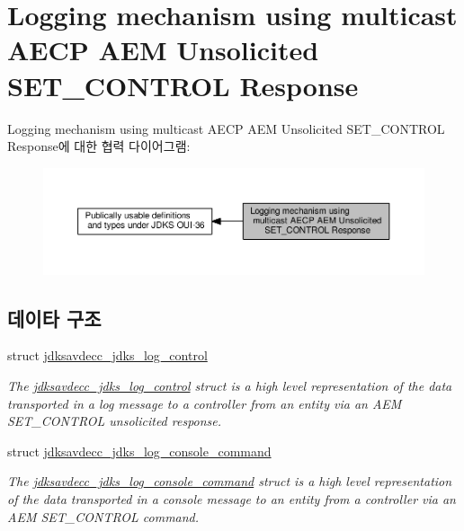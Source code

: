 \hypertarget{group__jdks__log}{}\section{Logging mechanism using multicast A\+E\+CP A\+EM Unsolicited S\+E\+T\+\_\+\+C\+O\+N\+T\+R\+OL Response}
\label{group__jdks__log}
Logging mechanism using multicast A\+E\+CP A\+EM Unsolicited S\+E\+T\+\_\+\+C\+O\+N\+T\+R\+OL Response에 대한 협력 다이어그램\+:
\nopagebreak
\begin{figure}[H]
\begin{center}
\leavevmode
\includegraphics[width=350pt]{group__jdks__log}
\end{center}
\end{figure}
\subsection*{데이타 구조}
\begin{DoxyCompactItemize}
\item 
struct \hyperlink{structjdksavdecc__jdks__log__control}{jdksavdecc\+\_\+jdks\+\_\+log\+\_\+control}
\begin{DoxyCompactList}\small\item\em The \hyperlink{structjdksavdecc__jdks__log__control}{jdksavdecc\+\_\+jdks\+\_\+log\+\_\+control} struct is a high level representation of the data transported in a log message to a controller from an entity via an A\+EM S\+E\+T\+\_\+\+C\+O\+N\+T\+R\+OL unsolicited response. \end{DoxyCompactList}\item 
struct \hyperlink{structjdksavdecc__jdks__log__console__command}{jdksavdecc\+\_\+jdks\+\_\+log\+\_\+console\+\_\+command}
\begin{DoxyCompactList}\small\item\em The \hyperlink{structjdksavdecc__jdks__log__console__command}{jdksavdecc\+\_\+jdks\+\_\+log\+\_\+console\+\_\+command} struct is a high level representation of the data transported in a console message to an entity from a controller via an A\+EM S\+E\+T\+\_\+\+C\+O\+N\+T\+R\+OL command. \end{DoxyCompactList}\end{DoxyCompactItemize}
